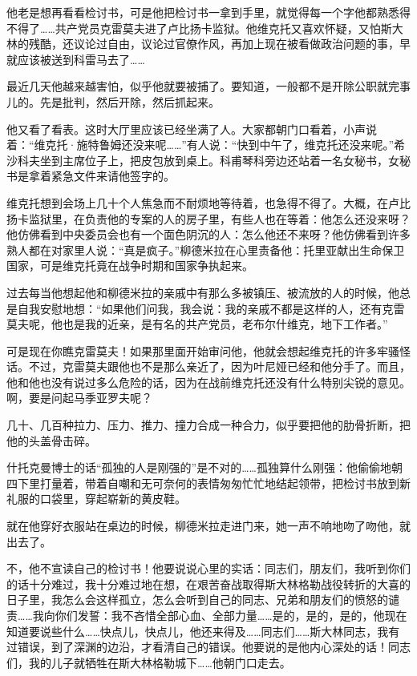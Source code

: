 他老是想再看看检讨书，可是他把检讨书一拿到手里，就觉得每一个字他都熟悉得不得了……共产党员克雷莫夫进了卢比扬卡监狱。他维克托又喜欢怀疑，又怕斯大林的残酷，还议论过自由，议论过官僚作风，再加上现在被看做政治问题的事，早就应该被送到科雷马去了……

最近几天他越来越害怕，似乎他就要被捕了。要知道，一般都不是开除公职就完事儿的。先是批判，然后开除，然后抓起来。

他又看了看表。这时大厅里应该已经坐满了人。大家都朝门口看着，小声说着：“维克托·施特鲁姆还没来呢……”有人说：“快到中午了，维克托还没来呢。”希沙科夫坐到主席位子上，把皮包放到桌上。科甫琴科旁边还站着一名女秘书，女秘书是拿着紧急文件来请他签字的。

维克托想到会场上几十个人焦急而不耐烦地等待着，也急得不得了。大概，在卢比扬卡监狱里，在负责他的专案的人的房子里，有些人也在等着：他怎么还没来呀？他仿佛看到中央委员会也有一个面色阴沉的人：怎么他还不来呀？他仿佛看到许多熟人都在对家里人说：“真是疯子。”柳德米拉在心里责备他：托里亚献出生命保卫国家，可是维克托竟在战争时期和国家争执起来。

过去每当他想起他和柳德米拉的亲戚中有那么多被镇压、被流放的人的时候，他总是自我安慰地想：“如果他们问我，我会说：我的亲戚不都是这样的人，还有克雷莫夫呢，他也是我的近亲，是有名的共产党员，老布尔什维克，地下工作者。”

可是现在你瞧克雷莫夫！如果那里面开始审问他，他就会想起维克托的许多牢骚怪话。不过，克雷莫夫跟他也不是那么亲近了，因为叶尼娅已经和他分手了。而且，他和他也没有说过多么危险的话，因为在战前维克托还没有什么特别尖锐的意见。啊，要是问起马季亚罗夫呢？

几十、几百种拉力、压力、推力、撞力合成一种合力，似乎要把他的肋骨折断，把他的头盖骨击碎。

什托克曼博士的话“孤独的人是刚强的”是不对的……孤独算什么刚强：他偷偷地朝四下里打量着，带着自嘲和无可奈何的表情匆匆忙忙地结起领带，把检讨书放到新礼服的口袋里，穿起崭新的黄皮鞋。

就在他穿好衣服站在桌边的时候，柳德米拉走进门来，她一声不响地吻了吻他，就出去了。

不，他不宣读自己的检讨书！他要说说心里的实话：同志们，朋友们，我听到你们的话十分难过，我十分难过地在想，在艰苦奋战取得斯大林格勒战役转折的大喜的日子里，我怎么会这样孤立，怎么会听到自己的同志、兄弟和朋友们的愤怒的谴责……我向你们发誓：我不吝惜全部心血、全部力量……是的，是的，是的，他现在知道要说些什么……快点儿，快点儿，他还来得及……同志们……斯大林同志，我有过错误，到了深渊的边沿，才看清自己的错误。他要说的是他内心深处的话！同志们，我的儿子就牺牲在斯大林格勒城下……他朝门口走去。

